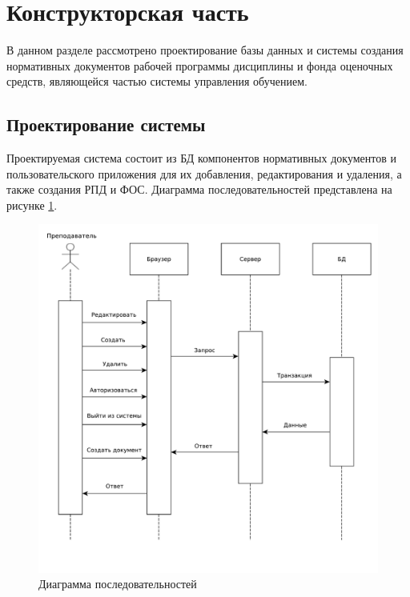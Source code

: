 \section{Конструкторская часть}

В данном разделе рассмотрено проектирование базы данных и системы создания нормативных документов рабочей программы дисциплины и фонда оценочных средств, являющейся частью системы управления обучением. 

\subsection{Проектирование системы}

Проектируемая система состоит из БД компонентов нормативных документов и пользовательского приложения для их добавления, редактирования и удаления, а также создания РПД и ФОС. Диаграмма последовательностей представлена на рисунке \ref{img:seq}.

\begin{figure}[h!]
	\begin{center}
		\includegraphics[scale=0.4666]{inc/img/sequence}
	\end{center}
	\captionsetup{justification=centering}
	\caption{Диаграмма последовательностей}
	\label{img:seq}
\end{figure}

